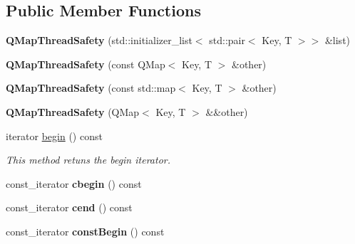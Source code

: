 \subsection*{Public Member Functions}
\begin{DoxyCompactItemize}
\item 
\mbox{\label{class_q_map_thread_safety_a8b1bc71d8c92c4d01b6b3baae9787bb4}} 
{\bfseries Q\+Map\+Thread\+Safety} (std\+::initializer\+\_\+list$<$ std\+::pair$<$ Key, T $>$$>$ \&list)
\item 
\mbox{\label{class_q_map_thread_safety_a368c8f4f05a48864209ab6ff5cf2f090}} 
{\bfseries Q\+Map\+Thread\+Safety} (const Q\+Map$<$ Key, T $>$ \&other)
\item 
\mbox{\label{class_q_map_thread_safety_a1335c04a2df7eda320f7a778854531fc}} 
{\bfseries Q\+Map\+Thread\+Safety} (const std\+::map$<$ Key, T $>$ \&other)
\item 
\mbox{\label{class_q_map_thread_safety_a9aacfb2a81fb927546a222cbfd78000d}} 
{\bfseries Q\+Map\+Thread\+Safety} (Q\+Map$<$ Key, T $>$ \&\&other)
\item 
iterator \mbox{\hyperlink{class_q_map_thread_safety_ac197a5375913e4ac19910b9bc4191a95}{begin}} () const
\begin{DoxyCompactList}\small\item\em This method retuns the begin iterator. \end{DoxyCompactList}\item 
\mbox{\label{class_q_map_thread_safety_aeddc5f7a55aebb3e93d78cf30a3dd2e1}} 
const\+\_\+iterator {\bfseries cbegin} () const
\item 
\mbox{\label{class_q_map_thread_safety_a199144509173057ede04d61f7294b266}} 
const\+\_\+iterator {\bfseries cend} () const
\item 
\mbox{\label{class_q_map_thread_safety_a300f55a4c8e8ed3b5ccc2824dc18e60c}} 
const\+\_\+iterator {\bfseries const\+Begin} () const
\item 
\mbox{\label{class_q_map_thread_safety_aa98a2af8cafc423c6bc6a04fec106b39}} 
$$
\end{DoxyCompactItemize}

